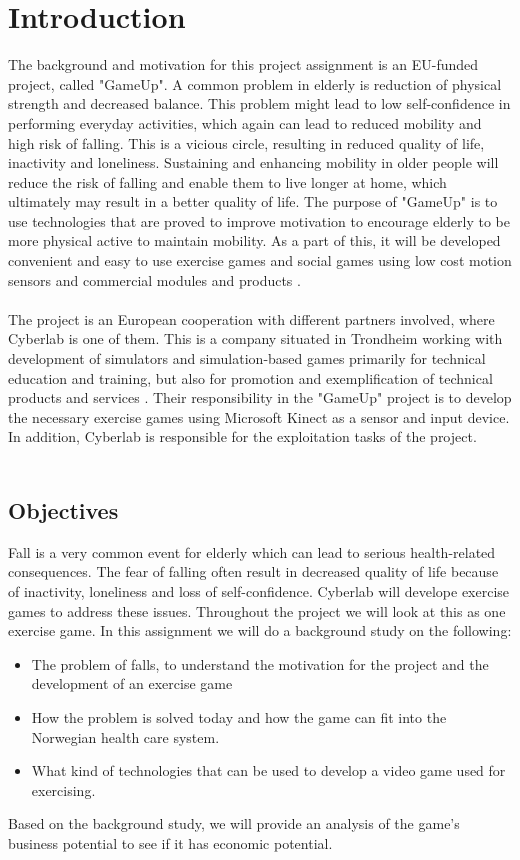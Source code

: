 \chapter{Introduction}
The background and motivation for this project assignment is an EU-funded project, called "GameUp". A common problem in elderly is reduction of physical strength and decreased balance. This problem might lead to low self-confidence in performing everyday activities, which again can lead to reduced mobility and high risk of falling. This is a vicious circle, resulting in reduced quality of life, inactivity and loneliness. Sustaining and enhancing mobility in older people will reduce the risk of falling and enable them to live longer at home, which ultimately may result in a better quality of life. The purpose of "GameUp" is to use technologies that are proved to improve motivation to encourage elderly to be more physical active to maintain mobility.  As a part of this, it will be developed convenient and easy to use exercise games and social games using low cost motion sensors and commercial modules and products \cite{gameup}.\\ \\ The project is an European cooperation with different partners involved, where Cyberlab is one of them. This is a company situated in Trondheim working with development of simulators and simulation-based games primarily for technical education and training, but also for promotion and exemplification of technical products and services \cite{cyberlab}. Their responsibility in the "GameUp" project is to develop the necessary exercise games using Microsoft Kinect as a sensor and input device. In addition, Cyberlab is responsible for the exploitation tasks of the project.  \\ \\

\section{Objectives}
Fall is a very common event for elderly which can lead to serious health-related consequences. The fear of falling often result in decreased quality of life because of inactivity, loneliness and loss of self-confidence. Cyberlab will develope exercise games to address these issues. Throughout the project we will look at this as one exercise game. In this assignment we will do a background study on the following:
\begin{itemize}
\renewcommand{\labelitemi}{$\bullet$}
\item The problem of falls, to understand the motivation for the project and the development of an exercise game 
\item How the problem is solved today and how the game can fit into the Norwegian health care system.
\item What kind of technologies that can be used to develop a video game used for exercising.
\end{itemize}
Based on the background study, we will provide an analysis of the game’s business potential to see if it has economic potential.

